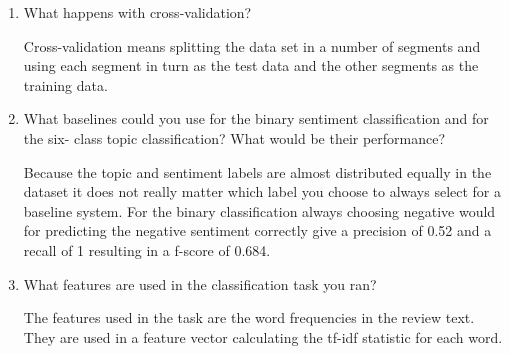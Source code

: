\documentclass[11pt]{article}
\begin{document}
\begin{enumerate}
\item What happens with cross-validation?

Cross-validation means splitting the data set in a number of segments and using each segment in turn as the test data and the other segments as the training data.

\item What baselines could you use for the binary sentiment classification and for the six- class topic classification? What would be their performance?

Because the topic and sentiment labels are almost distributed equally in the dataset it does not really matter which label you choose to always select for a baseline system. For the binary classification always choosing negative would for predicting the negative sentiment correctly give a precision of 0.52 and a recall of 1 resulting in a f-score of 0.684.

\item What features are used in the classification task you ran?

The features used in the task are the word frequencies in the review text. They are used in a feature vector calculating the tf-idf statistic for each word.

\end{enumerate}



\end{document}
